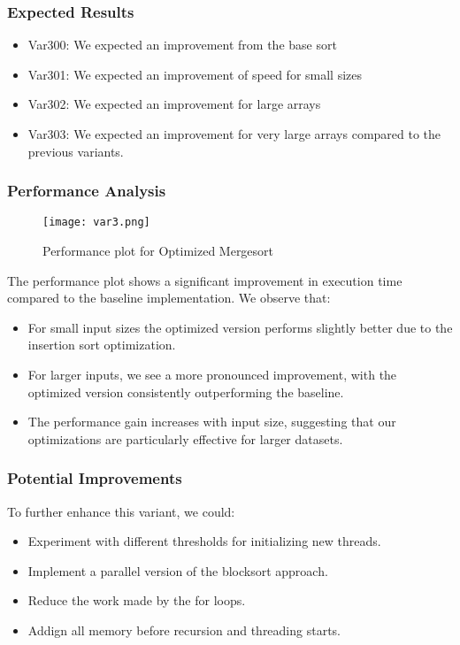 \documentclass[twocolumn]{article}
\begin{document}
\subsubsection{Expected Results}
\begin{itemize}
	\item Var300: We expected an improvement from the base sort
	\item Var301: We expected an improvement of speed for small sizes
	\item Var302: We expected an improvement for large arrays
	\item Var303: We expected an improvement for very large arrays compared to the previous variants.
\end{itemize}

\subsubsection{Performance Analysis}
\begin{figure}[H]
    \centering
    \texttt{[image: var3.png]}
    \caption{Performance plot for Optimized Mergesort}
    \label{fig:variant4_plot}
\end{figure}

The performance plot shows a significant improvement in execution time compared to the baseline  implementation. We observe that:
\begin{itemize}
    \item For small input sizes the optimized version performs slightly better due to the insertion sort optimization.
    \item For larger inputs, we see a more pronounced improvement, with the optimized version consistently outperforming the baseline.
    \item The performance gain increases with input size, suggesting that our optimizations are particularly effective for larger datasets.
\end{itemize}

\subsubsection{Potential Improvements}
To further enhance this variant, we could:
\begin{itemize}
    \item Experiment with different thresholds for initializing new threads.
    \item Implement a parallel version of the blocksort approach.
    \item Reduce the work made by the for loops.
    \item Addign all memory before recursion and threading starts.
\end{itemize}
\end{document}
